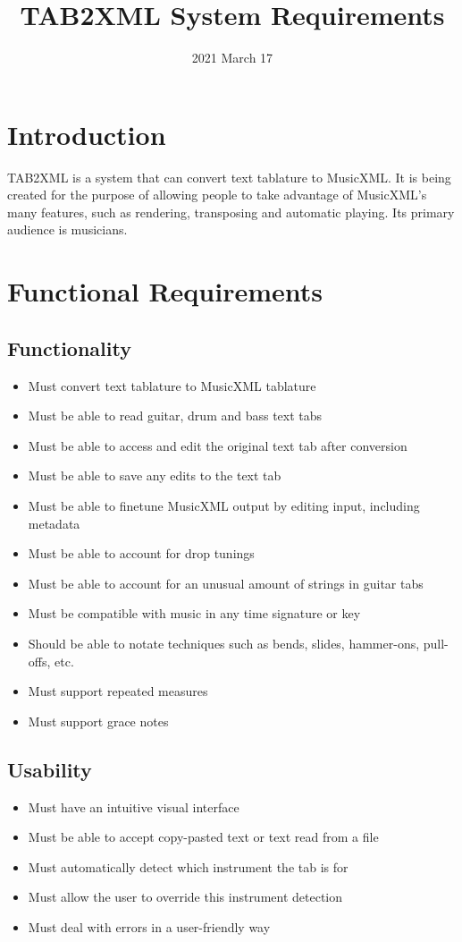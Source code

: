 \documentclass[11pt]{article}
\date{2021 March 17}
\title{TAB2XML System Requirements}
\begin{document}
\maketitle
\tableofcontents

\newpage
\section{Introduction}
\label{sec:org099750a}
TAB2XML is a system that can convert text tablature to MusicXML.  It is being created for the purpose of allowing people to take advantage of MusicXML's many features, such as rendering, transposing and automatic playing.  Its primary audience is musicians.
\section{Functional Requirements}
\label{sec:org2c13d39}
\subsection{Functionality}
\label{sec:org04d80b5}
\begin{itemize}
\item Must convert text tablature to MusicXML tablature
\item Must be able to read guitar, drum and bass text tabs
\item Must be able to access and edit the original text tab after conversion
\item Must be able to save any edits to the text tab
\item Must be able to finetune MusicXML output by editing input, including metadata
\item Must be able to account for drop tunings
\item Must be able to account for an unusual amount of strings in guitar tabs
\item Must be compatible with music in any time signature or key
\item Should be able to notate techniques such as bends, slides, hammer-ons, pull-offs, etc.
\item Must support repeated measures
\item Must support grace notes
\end{itemize}
\subsection{Usability}
\label{sec:org7c381f1}
\begin{itemize}
\item Must have an intuitive visual interface
\item Must be able to accept copy-pasted text or text read from a file
\item Must automatically detect which instrument the tab is for
\item Must allow the user to override this instrument detection
\item Must deal with errors in a user-friendly way
\end{itemize}
\end{document}
